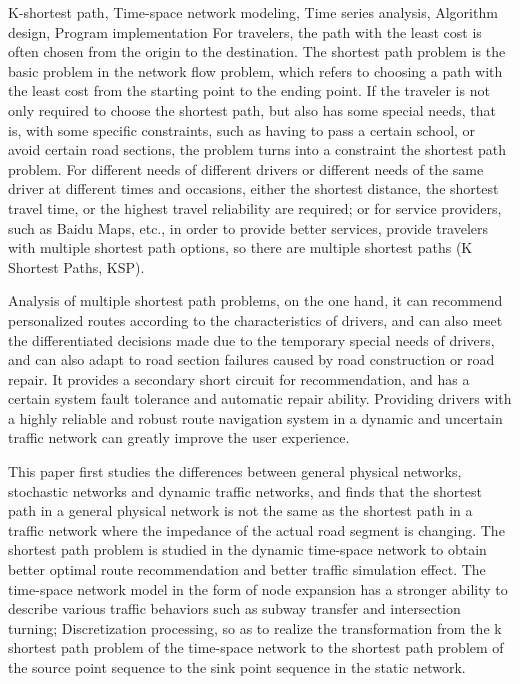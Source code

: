 \begin{englishabstract}{K-shortest path, Time-space network modeling, Time series analysis, Algorithm design, Program implementation}
    For travelers, the path with the least cost is often chosen from the origin to the destination. The shortest path problem is the basic problem in the network flow problem, which refers to choosing a path with the least cost from the starting point to the ending point. If the traveler is not only required to choose the shortest path, but also has some special needs, that is, with some specific constraints, such as having to pass a certain school, or avoid certain road sections, the problem turns into a constraint the shortest path problem. For different needs of different drivers or different needs of the same driver at different times and occasions, either the shortest distance, the shortest travel time, or the highest travel reliability are required; or for service providers, such as Baidu Maps, etc., in order to provide better services, provide travelers with multiple shortest path options, so there are multiple shortest paths (K Shortest Paths, KSP).

    Analysis of multiple shortest path problems, on the one hand, it can recommend personalized routes according to the characteristics of drivers, and can also meet the differentiated decisions made due to the temporary special needs of drivers, and can also adapt to road section failures caused by road construction or road repair. It provides a secondary short circuit for recommendation, and has a certain system fault tolerance and automatic repair ability. Providing drivers with a highly reliable and robust route navigation system in a dynamic and uncertain traffic network can greatly improve the user experience.

    This paper first studies the differences between general physical networks, stochastic networks and dynamic traffic networks, and finds that the shortest path in a general physical network is not the same as the shortest path in a traffic network where the impedance of the actual road segment is changing. The shortest path problem is studied in the dynamic time-space network to obtain better optimal route recommendation and better traffic simulation effect. The time-space network model in the form of node expansion has a stronger ability to describe various traffic behaviors such as subway transfer and intersection turning; Discretization processing, so as to realize the transformation from the k shortest path problem of the time-space network to the shortest path problem of the source point sequence to the sink point sequence in the static network.


\end{englishabstract}
